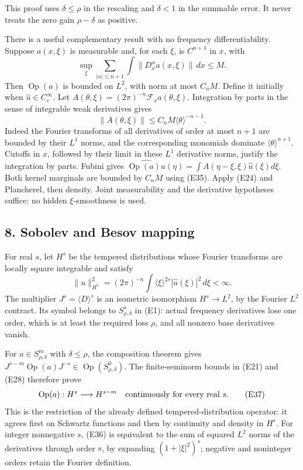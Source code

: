 \documentclass[
  11pt,
]{article}
\begin{document}
This proof uses \(\delta\leq\rho\) in the rescaling and \(\delta<1\) in
the summable error. It never treats the zero gain \(\rho-\delta\) as
positive.

There is a useful complementary result with no frequency
differentiability. Suppose \(a(x,\xi)\) is measurable and, for each
\(\xi\), is \(C^{n+1}\) in \(x\), with \[
\sup_\xi\sum_{|\alpha|\leq n+1}
\int\|D_x^\alpha a(x,\xi)\|\,dx\leq M.
\tag{E34}
\] Then \(\operatorname{Op}(a)\) is bounded on \(L^2\), with norm at
most \(C_nM\). Define it initially when \(\widehat u\in C_c^\infty\).
Let \(A(\theta,\xi)=(2\pi)^{-n}\mathcal F_xa(\theta,\xi)\). Integration
by parts in the sense of integrable weak derivatives gives \[
\|A(\theta,\xi)\|\leq C_nM\langle\theta\rangle^{-n-1}.
\tag{E35}
\] Indeed the Fourier transforms of all derivatives of order at most
\(n+1\) are bounded by their \(L^1\) norms, and the corresponding
monomials dominate \(\langle\theta\rangle^{n+1}\). Cutoffs in \(x\),
followed by their limit in these \(L^1\) derivative norms, justify the
integration by parts. Fubini gives
\(\widehat{\operatorname{Op}(a)u}(\eta)=\int A(\eta-\xi,\xi)\widehat u(\xi)d\xi\).
Both kernel marginals are bounded by \(C_nM\) using (E35). Apply (E24)
and Plancherel, then density. Joint measurability and the derivative
hypotheses suffice; no hidden \(\xi\)-smoothness is used.

\subsection{8. Sobolev and Besov
mapping}\label{sobolev-and-besov-mapping}

For real \(s\), let \(H^s\) be the tempered distributions whose Fourier
transforms are locally square integrable and satisfy \[
\|u\|_{H^s}^2=(2\pi)^{-n}
\int\langle\xi\rangle^{2s}|\widehat u(\xi)|^2\,d\xi<\infty.
\tag{E36}
\] The multiplier \(J^s=\langle D\rangle^s\) is an isometric isomorphism
\(H^s\to L^2\), by the Fourier \(L^2\) contract. Its symbol belongs to
\(S^s_{\rho,\delta}\) in (E1): actual frequency derivatives lose one
order, which is at least the required loss \(\rho\), and all nonzero
base derivatives vanish.

For \(a\in S^m_{\rho,\delta}\) with \(\delta\leq\rho\), the composition
theorem gives
\(J^{s-m}\operatorname{Op}(a)J^{-s}\in\operatorname{Op}(S^0_{\rho,\delta})\).
The finite-seminorm bounds in (E21) and (E28) therefore prove \[
\operatorname{Op}(a):H^s\longrightarrow H^{s-m}
\quad\hbox{continuously for every real }s.
\tag{E37}
\] This is the restriction of the already defined tempered-distribution
operator: it agrees first on Schwartz functions and then by continuity
and density in \(H^s\). For integer nonnegative \(s\), (E36) is
equivalent to the sum of squared \(L^2\) norms of the derivatives
through order \(s\), by expanding \((1+|\xi|^2)^s\); negative and
noninteger orders retain the Fourier definition.
\end{document}
